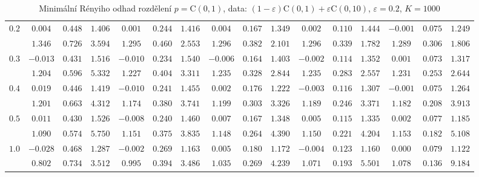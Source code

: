 \begin{table}[ht]
\begin{center}
\begin{tabular}{|c|ccc|ccc|ccc|ccc|ccc|}
\hline 
$0.2$ & $ 0.004 $ & $ 0.448 $ & $ 1.406 $ & $ 0.001 $ & $ 0.244 $ & $ 1.416 $ & $ 0.004 $ & $ 0.167 $ & $ 1.349 $ & $ 0.002 $ & $ 0.110 $ & $ 1.444 $ & $ -0.001 $ & $ 0.075 $ & $ 1.249 $\\ 
 & $ 1.346 $ & $ 0.726 $ & $ 3.594 $ & $ 1.295 $ & $ 0.460 $ & $ 2.553 $ & $ 1.296 $ & $ 0.382 $ & $ 2.101 $ & $ 1.296 $ & $ 0.339 $ & $ 1.782 $ & $ 1.289 $ & $ 0.306 $ & $ 1.806 $\\ 
\hline 
$0.3$ & $ -0.013 $ & $ 0.431 $ & $ 1.516 $ & $ -0.010 $ & $ 0.234 $ & $ 1.540 $ & $ -0.006 $ & $ 0.164 $ & $ 1.403 $ & $ -0.002 $ & $ 0.114 $ & $ 1.352 $ & $ 0.001 $ & $ 0.073 $ & $ 1.317 $\\ 
 & $ 1.204 $ & $ 0.596 $ & $ 5.332 $ & $ 1.227 $ & $ 0.404 $ & $ 3.311 $ & $ 1.235 $ & $ 0.328 $ & $ 2.844 $ & $ 1.235 $ & $ 0.283 $ & $ 2.557 $ & $ 1.231 $ & $ 0.253 $ & $ 2.644 $\\ 
\hline 
$0.4$ & $ 0.019 $ & $ 0.446 $ & $ 1.419 $ & $ -0.010 $ & $ 0.241 $ & $ 1.455 $ & $ 0.002 $ & $ 0.176 $ & $ 1.222 $ & $ -0.003 $ & $ 0.116 $ & $ 1.307 $ & $ -0.001 $ & $ 0.075 $ & $ 1.264 $\\ 
 & $ 1.201 $ & $ 0.663 $ & $ 4.312 $ & $ 1.174 $ & $ 0.380 $ & $ 3.741 $ & $ 1.199 $ & $ 0.303 $ & $ 3.326 $ & $ 1.189 $ & $ 0.246 $ & $ 3.371 $ & $ 1.182 $ & $ 0.208 $ & $ 3.913 $\\ 
\hline 
$0.5$ & $ 0.011 $ & $ 0.430 $ & $ 1.526 $ & $ -0.008 $ & $ 0.240 $ & $ 1.460 $ & $ 0.007 $ & $ 0.167 $ & $ 1.348 $ & $ 0.005 $ & $ 0.115 $ & $ 1.335 $ & $ 0.002 $ & $ 0.077 $ & $ 1.185 $\\ 
 & $ 1.090 $ & $ 0.574 $ & $ 5.750 $ & $ 1.151 $ & $ 0.375 $ & $ 3.835 $ & $ 1.148 $ & $ 0.264 $ & $ 4.390 $ & $ 1.150 $ & $ 0.221 $ & $ 4.204 $ & $ 1.153 $ & $ 0.182 $ & $ 5.108 $\\ 
\hline 
$1.0$ & $ -0.028 $ & $ 0.468 $ & $ 1.287 $ & $ -0.002 $ & $ 0.269 $ & $ 1.163 $ & $ 0.005 $ & $ 0.180 $ & $ 1.172 $ & $ -0.004 $ & $ 0.123 $ & $ 1.160 $ & $ 0.000 $ & $ 0.079 $ & $ 1.122 $\\ 
 & $ 0.802 $ & $ 0.734 $ & $ 3.512 $ & $ 0.995 $ & $ 0.394 $ & $ 3.486 $ & $ 1.035 $ & $ 0.269 $ & $ 4.239 $ & $ 1.071 $ & $ 0.193 $ & $ 5.501 $ & $ 1.078 $ & $ 0.136 $ & $ 9.184 $\\ 
\hline 
\end{tabular}
\caption{Minimální Rényiho odhad rozdělení $p = \mathrm{C}(0,1)$, data: $(1-\varepsilon)\mathrm{C}(0,1) + \varepsilon \mathrm{C}(0,10)$, $\varepsilon =  0.2$, $K = 1000$} 
\end{center}
\end{table}

